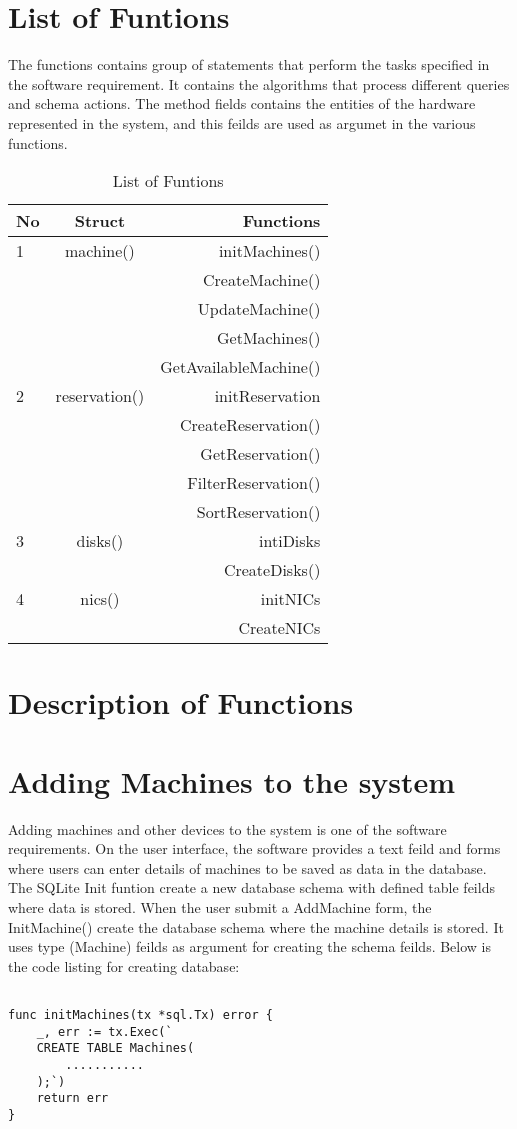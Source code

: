 \section{List of Funtions}
The functions contains group of statements that perform the tasks specified in the software requirement. It contains the algorithms that process different  queries and schema actions. The method fields contains the entities of the hardware represented in the system, and this feilds are used as argumet in the various functions. 
\begin{table}[h!]
  \centering
  \label{tab:table1}
  \begin{tabular}{l|c||r}
    No & Struct& Functions\\
    \hline
    1 &machine() &  initMachines()\\
      && CreateMachine()\\
      &&UpdateMachine()\\
      &&GetMachines()\\
      &&GetAvailableMachine()\\
     \hline
    2 &reservation() & initReservation\\
    && CreateReservation()\\
    && GetReservation()\\
    && FilterReservation()\\
    && SortReservation()\\
    \hline
    3 &disks() & intiDisks\\
    && CreateDisks()\\
    \hline
    4 &nics() & initNICs\\
    && CreateNICs
  \end{tabular}
  \caption{List of Funtions}
\end{table}
\pagebreak
\section{Description of Functions}
\section*{Adding Machines to the system}
Adding machines and other devices to the system is one of the software  requirements. On the user interface, the software provides a text feild and forms where users can enter details of machines to be saved as data in the database. The SQLite Init funtion create a new database schema with defined table feilds where data is stored. When the user submit a AddMachine form, the InitMachine() create the database schema where the machine details is stored. It uses type (Machine) feilds as argument for creating the schema feilds. Below is the code listing for creating database:
\begin{lstlisting}[caption=Creating Database for machine, label=Intitializing database]

func initMachines(tx *sql.Tx) error {
	_, err := tx.Exec(`
	CREATE TABLE Machines(
		...........
	);`)
	return err
}
\end{lstlisting}

